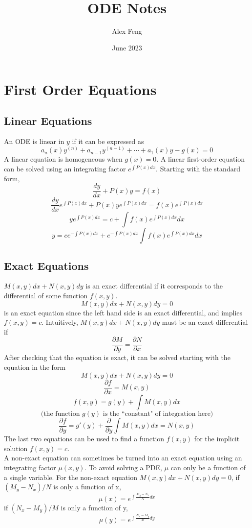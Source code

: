 \documentclass{article}
\title{ODE Notes}
\author{Alex Feng}
\date{June 2023}
\begin{document}
\maketitle

\section{First Order Equations}
\subsection{Linear Equations}
An ODE is linear in $y$ if it can be expressed as 
$$a_n (x) y ^ {(n)} + a_{n-1} y^{(n-1)} + \cdots + a_1 (x) y - g(x) = 0$$
A linear equation is homogeneous when $g(x) = 0$. A linear first-order equation can be solved using an integrating factor $e^{\int P(x) dx}$. Starting with the standard form, 
$$\frac{dy}{dx} + P(x)y = f(x)$$
$$\frac{dy}{dx} e^{\int P(x) dx} + P(x)y e^{\int P(x) dx} = f(x)e^{\int P(x) dx}$$
$$ye^{\int P(x) dx} =c+ \int f(x)e^{\int P(x) dx} dx$$
$$y = ce^{-\int P(x) dx} + e^{-\int P(x) dx}\int f(x)e^{\int P(x) dx} dx$$
\subsection{Exact Equations}
$M(x,y) dx + N(x,y) dy$ is an exact differential if it corresponds to the differential of some function $f(x,y)$.
$$M(x,y) dx + N(x,y) dy = 0 $$
is an exact equation since the left hand side is an exact differential, and implies $f(x,y) = c$. Intuitively, $M(x,y)dx + N(x,y) dy $ must be an exact differential if 
$$\frac{\partial M}{\partial y} = \frac{\partial N}{\partial x}$$
After checking that the equation is exact, it can be solved starting with the equation in the form
$$M(x,y) dx + N(x,y) dy = 0 $$
$$\frac{\partial f}{\partial x} = M(x,y)$$
$$f(x,y) = g(y) + \int M(x,y) dx$$
$$\textrm{(the function }g(y)\textrm{ is the ``constant" of integration here)}$$
$$\frac{\partial f}{\partial y} =   g'(y) + \frac{\partial}{\partial y} \int M(x,y) dx = N(x,y)$$
The last two equations can be used to find a function $f(x,y)$ for the implicit solution $f(x,y) = c$. \\A non-exact equation can sometimes be turned into an exact equation using an integrating factor $\mu (x,y)$. To avoid solving a PDE, $\mu$ can only be a function of a single variable. For the non-exact equation $M(x,y) dx + N(x,y) dy = 0 $,
if $(M_y - N_x)/N$ is only a function of x,
$$\mu (x) = e^{\int \frac{M_y - N_x}{N} dx}$$
if $(N_x - M_y)/M$ is only a function of y,
$$\mu(y)= e^{\int \frac{N_x - M_y}{M} dy}$$
\end{document}
